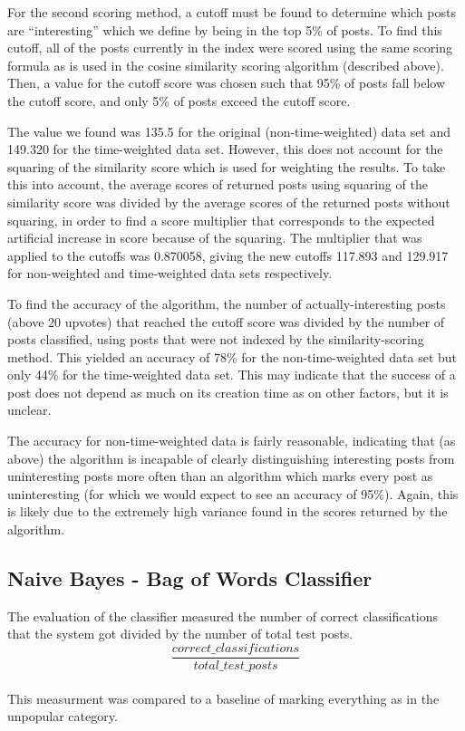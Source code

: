 \documentclass{acm_proc_article-sp}
\begin{document}
For the second scoring method, a cutoff must be found to determine which posts are ``interesting'' which we define by
being in the top 5\% of posts.  To find this cutoff, all of the posts currently in the index were scored using the
same scoring formula as is used in the cosine similarity scoring algorithm (described above).  Then, a value for
the cutoff score was chosen such that 95\% of posts fall below the cutoff score, and only 5\% of posts exceed the
cutoff score.

The value we found was 135.5 for the original (non-time-weighted) data set and 149.320 for the time-weighted data set.
However, this does not account for the squaring of the similarity score which is used for weighting the results.  To
take this into account, the average scores of returned posts using squaring of the similarity score was divided by the average
scores of the returned posts without squaring, in order to find a score multiplier that corresponds to the 
expected artificial increase in score because of the squaring.  The multiplier that was applied to the cutoffs
was 0.870058, giving the new cutoffs 117.893 and 129.917 for non-weighted and time-weighted data sets respectively.

To find the accuracy of the algorithm, the number of actually-interesting posts (above 20 upvotes) that reached
the cutoff score was divided by the number of posts classified, using posts that were not indexed by the
similarity-scoring method.  This yielded an accuracy of 78\% for the non-time-weighted data set but only 44\% for
the time-weighted data set.  This may indicate that the success of a post does not depend as much on its creation
time as on other factors, but it is unclear.

The accuracy for non-time-weighted data is fairly reasonable, indicating that (as above) the algorithm is incapable
of clearly distinguishing interesting posts from uninteresting posts more often than an algorithm which marks
every post as uninteresting (for which we would expect to see an accuracy of 95\%).
Again, this is likely due to the extremely high variance found in the scores returned by the
algorithm.

\subsection{Naive Bayes - Bag of Words Classifier}
The evaluation of the classifier measured the number of correct classifications that the system got divided by the number of total test posts.\\
$$\frac{correct\_classifications}{total\_test\_posts}$$\\
This measurment was compared to a baseline of marking everything as in the unpopular category.
\end{document}
